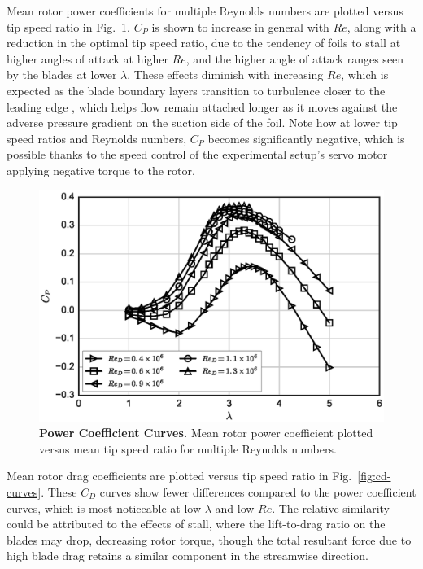 \documentclass[10pt,letterpaper]{article}
\begin{document}
Mean rotor power coefficients for multiple Reynolds numbers are plotted versus
tip speed ratio in Fig.~\ref{fig:cp-curves}. $C_P$ is shown to increase in
general with $Re$, along with a reduction in the optimal tip speed ratio, due to
the tendency of foils to stall at higher angles of attack at higher $Re$, and
the higher angle of attack ranges seen by the blades at lower $\lambda$. These
effects diminish with increasing $Re$, which is expected as the blade boundary
layers transition to turbulence closer to the leading edge \cite{Lissaman1983,
    Bachant2015-RVAT-Re-dep}, which helps flow remain attached longer as it moves
against the adverse pressure gradient on the suction side of the foil. Note how
at lower tip speed ratios and Reynolds numbers, $C_P$ becomes significantly
negative, which is possible thanks to the speed control of the experimental
setup's servo motor applying negative torque to the rotor.

\begin{figure}[h]
    \includegraphics[width=\textwidth]{figures/cp_curves.eps}

    \caption{{\bf Power Coefficient Curves.} Mean rotor power coefficient
    plotted versus mean tip speed ratio for multiple Reynolds numbers.}

    \label{fig:cp-curves}
\end{figure}

Mean rotor drag coefficients are plotted versus tip speed ratio in
Fig.~\ref{fig:cd-curves}. These $C_D$ curves show fewer differences compared to
the power coefficient curves, which is most noticeable at low $\lambda$ and low
$Re$. The relative similarity could be attributed to the effects of stall, where
the lift-to-drag ratio on the blades may drop, decreasing rotor torque, though
the total resultant force due to high blade drag retains a similar component in
the streamwise direction.
\end{document}
